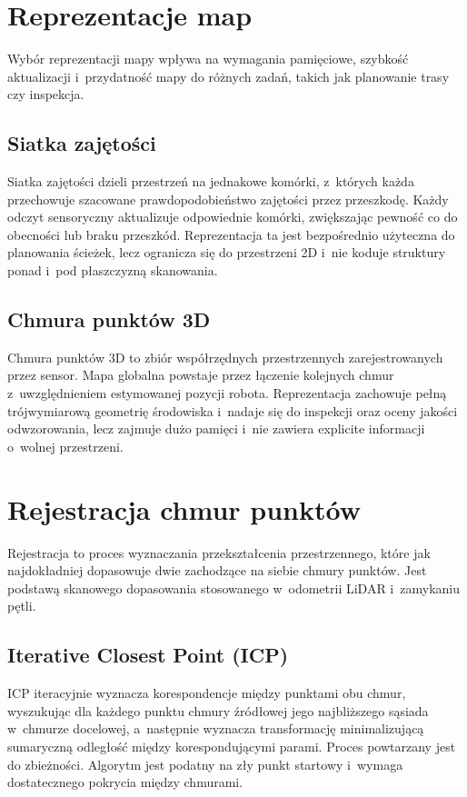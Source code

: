 \section{Reprezentacje map}

Wybór reprezentacji mapy wpływa na wymagania pamięciowe, szybkość aktualizacji
i~przydatność mapy do różnych zadań, takich jak planowanie trasy czy inspekcja.

\subsection{Siatka zajętości}

Siatka zajętości dzieli przestrzeń na jednakowe komórki, z~których każda
przechowuje szacowane prawdopodobieństwo zajętości przez przeszkodę.
Każdy odczyt sensoryczny aktualizuje odpowiednie komórki, zwiększając pewność
co do obecności lub braku przeszkód.
Reprezentacja ta jest bezpośrednio użyteczna do planowania ścieżek,
lecz ogranicza się do przestrzeni 2D i~nie koduje struktury ponad
i~pod płaszczyzną skanowania.

\subsection{Chmura punktów 3D}

Chmura punktów 3D to zbiór współrzędnych przestrzennych zarejestrowanych
przez sensor.
Mapa globalna powstaje przez łączenie kolejnych chmur z~uwzględnieniem
estymowanej pozycji robota.
Reprezentacja zachowuje pełną trójwymiarową geometrię środowiska i~nadaje się
do inspekcji oraz oceny jakości odwzorowania, lecz zajmuje dużo pamięci
i~nie zawiera explicite informacji o~wolnej przestrzeni.

\section{Rejestracja chmur punktów}

Rejestracja to proces wyznaczania przekształcenia przestrzennego, które jak
najdokładniej dopasowuje dwie zachodzące na siebie chmury punktów.
Jest podstawą skanowego dopasowania stosowanego w~odometrii LiDAR i~zamykaniu
pętli.

\subsection{Iterative Closest Point (ICP)}

ICP iteracyjnie wyznacza korespondencje między punktami obu chmur,
wyszukując dla każdego punktu chmury źródłowej jego najbliższego sąsiada
w~chmurze docelowej, a~następnie wyznacza transformację minimalizującą
sumaryczną odległość między korespondującymi parami.
Proces powtarzany jest do zbieżności.
Algorytm jest podatny na zły punkt startowy i~wymaga dostatecznego pokrycia
między chmurami.


